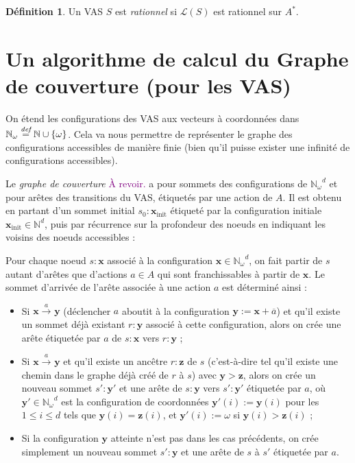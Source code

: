 \documentclass[a4paper,final]{article}
\theoremstyle{definition}
\newtheorem{Definition}[Theorem]{Définition}
\let\leq\leqslant
\newcommand{\lucas}[1]{\textcolor{purple}{#1}}
\newcommand{\os}[1]{\left\{\mathinner{#1}\right\}}
\newcommand{\defeq}{\ensuremath{\stackrel{\textit{def}}{=}}}
\let\union\cup
\newcommand{\N}{\ensuremath{\mathbb{N}}}
\newcommand{\Nomega}{\ensuremath{\mathbb{N}_\omega}}
\newcommand{\lang}{\ensuremath{\mathcal{L}}}
\newcommand{\trans}[2]{\ensuremath{\stackrel{#1}{\longrightarrow}_{#2}}}
\newcommand{\vect}[1]{\ensuremath{\mathbf{#1}}}
\newcommand{\xinit}{\ensuremath{\vect{x}_\text{init}}}
\newcommand{\valeur}[1]{\ensuremath{\overline{#1}}}
\begin{document}
\begin{Definition}
Un VAS $S$ est \emph{rationnel} si $\lang(S)$ est rationnel sur $A^\ast$.
\end{Definition}

\section{Un algorithme de calcul du Graphe de couverture (pour les VAS)}

On étend les configurations des VAS aux vecteurs à coordonnées dans $\Nomega\defeq \N\union\os{\omega}$.
Cela va nous permettre de représenter le graphe des configurations accessibles de manière finie (bien qu'il puisse exister une infinité de configurations accessibles).

Le \emph{graphe de couverture} \lucas{À revoir.}
a pour sommets des configurations de $\Nomega^d$ et pour arêtes des transitions du VAS, étiquetés par une action de $A$.
Il est obtenu en partant d'un sommet initial $s_0:\xinit$ étiqueté par la configuration initiale $\xinit\in \N^d$, puis par récurrence sur la profondeur des noeuds en indiquant les voisins des noeuds accessibles :

Pour chaque noeud $s:\vect{x}$ associé à la configuration $\vect{x}\in \Nomega^d$, on fait partir de $s$ autant d'arêtes que d'actions $a\in A$ qui sont franchissables à partir de $\vect{x}$.
Le sommet d'arrivée de l'arête associée à une action $a$ est déterminé ainsi :
\begin{itemize}
    \item Si $\vect{x}\trans{a}{} \vect{y}$ (déclencher $a$ aboutit à la configuration $\vect{y} := \vect{x} + \valeur{a}$) 
    et qu'il existe un sommet déjà existant $r:\vect{y}$ associé à cette configuration, alors on crée une arête étiquetée par $a$ de $s:\vect{x}$ vers $r:\vect{y}$ ;
    \item Si $\vect{x}\trans{a}{} \vect{y}$ et qu'il existe un ancêtre $r:\vect{z}$ de $s$ (c'est-à-dire tel qu'il existe une chemin dans le graphe déjà créé de $r$ à $s$) avec $\vect{y}>\vect{z}$, 
    alors on crée un nouveau sommet $s':\vect{y'}$ et une arête de $s:\vect{y}$ vers $s':\vect{y'}$ étiquetée par $a$, 
    où $\vect{y'}\in \Nomega^d$ est la configuration de coordonnées $\vect{y'}(i):=\vect{y}(i)$ pour les $1\leq i\leq d$ tels que $\vect{y}(i)=\vect{z}(i)$, et $\vect{y'}(i):=\omega$ si $\vect{y}(i)>\vect{z}(i)$ ;
    \item Si la configuration $\vect{y}$ atteinte n'est pas dans les cas précédents, on crée simplement un nouveau sommet $s':\vect{y}$ et une arête de $s$ à $s'$ étiquetée par $a$.
\end{itemize}
\end{document}
